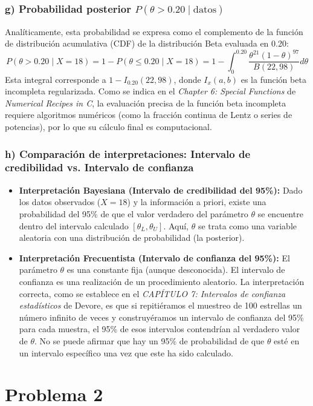 \documentclass[12pt]{article}
\begin{document}
\subsubsection*{g) Probabilidad posterior $P(\theta > 0.20 \mid \text{datos})$}
Analíticamente, esta probabilidad se expresa como el complemento de la función de distribución acumulativa (CDF) de la distribución Beta evaluada en 0.20:
$$
P(\theta > 0.20 \mid X=18) = 1 - P(\theta \leq 0.20 \mid X=18) = 1 - \int_{0}^{0.20} \frac{\theta^{21}(1-\theta)^{97}}{B(22, 98)} d\theta
$$
Esta integral corresponde a $1 - I_{0.20}(22, 98)$, donde $I_x(a, b)$ es la función beta incompleta regularizada. Como se indica en el \textit{Chapter 6: Special Functions} de \textit{Numerical Recipes in C}, la evaluación precisa de la función beta incompleta requiere algoritmos numéricos (como la fracción continua de Lentz o series de potencias), por lo que su cálculo final es computacional.

\subsubsection*{h) Comparación de interpretaciones: Intervalo de credibilidad vs. Intervalo de confianza}
\begin{itemize}
    \item \textbf{Interpretación Bayesiana (Intervalo de credibilidad del 95\%):} Dado los datos observados ($X=18$) y la información a priori, existe una probabilidad del 95\% de que el valor verdadero del parámetro $\theta$ se encuentre dentro del intervalo calculado $[\theta_L, \theta_U]$. Aquí, $\theta$ se trata como una variable aleatoria con una distribución de probabilidad (la posterior).
    \item \textbf{Interpretación Frecuentista (Intervalo de confianza del 95\%):} El parámetro $\theta$ es una constante fija (aunque desconocida). El intervalo de confianza es una realización de un procedimiento aleatorio. La interpretación correcta, como se establece en el \textit{CAPÍTULO 7: Intervalos de confianza estadísticos} de Devore, es que si repitiéramos el muestreo de 100 estrellas un número infinito de veces y construyéramos un intervalo de confianza del 95\% para cada muestra, el 95\% de esos intervalos contendrían al verdadero valor de $\theta$. No se puede afirmar que hay un 95\% de probabilidad de que $\theta$ esté en un intervalo específico una vez que este ha sido calculado.
\end{itemize}

\section{Problema 2}
\end{document}
